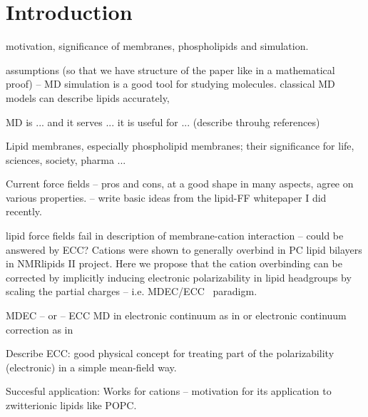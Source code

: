\documentclass[aip,jcp,twocolumn]{revtex4}
\begin{document}
\section{Introduction}

 motivation, significance of membranes, phospholipids and simulation.

 assumptions (so that we have structure of the paper like in a mathematical proof) -- 
 MD simulation is a good tool for studying molecules.
 classical MD models can describe lipids accurately, 

 MD is ... and it serves ... it is useful for ... (describe throuhg references)

 Lipid membranes, especially phospholipid membranes; their significance for life, sciences, society, pharma ...


 Current force fields -- pros and cons, at a good shape in many aspects, agree on various properties.  -- write basic ideas from the lipid-FF whitepaper I did recently.

 lipid force fields fail in description of membrane-cation interaction -- could be answered by ECC? 
Cations were shown to generally overbind in PC lipid bilayers in NMRlipids II project. 
Here we propose that the cation overbinding can be corrected by implicitly inducing electronic polarizability in lipid headgroups by scaling the partial charges -- i.e. MDEC/ECC~\cite{leontyev11} paradigm.

MDEC -- or -- ECC 
MD in electronic continuum as in \cite{leontyev11} or electronic continuum correction as in \cite{Jungwirth2015}

Describe ECC: good physical concept for treating part of the polarizability (electronic) in a simple mean-field way.

Succesful application: Works for cations \cite{Jungwirth2015,kohagen14,kohagen16} -- motivation for its application to zwitterionic lipids like POPC.
\end{document}
